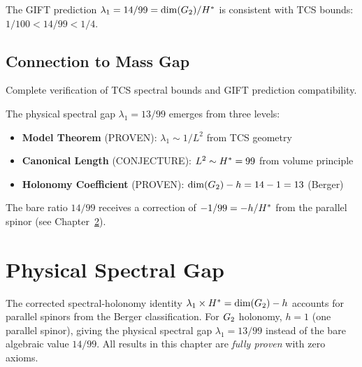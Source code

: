 \begin{theorem}\label{thm:gift_prediction}
    \leanok
    The GIFT prediction $\lambda_1 = 14/99 = \dim(G_2)/H^*$ is consistent
    with TCS bounds: $1/100 < 14/99 < 1/4$.
\end{theorem}

\section{Connection to Mass Gap}

\begin{theorem}\label{thm:tcs_certificate}
    \leanok
    Complete verification of TCS spectral bounds and GIFT prediction compatibility.
\end{theorem}

\begin{remark}
    The physical spectral gap $\lambda_1 = 13/99$ emerges from three levels:
    \begin{itemize}
        \item \textbf{Model Theorem} (PROVEN): $\lambda_1 \sim 1/L^2$ from TCS geometry
        \item \textbf{Canonical Length} (CONJECTURE): $L^2 \sim H^* = 99$ from volume principle
        \item \textbf{Holonomy Coefficient} (PROVEN): $\mathrm{dim}(G_2) - h = 14 - 1 = 13$ (Berger)
    \end{itemize}
    The bare ratio $14/99$ receives a correction of $-1/99 = -h/H^*$ from the
    parallel spinor (see Chapter~\ref{chap:physical_spectral}).
\end{remark}

\chapter{Physical Spectral Gap}\label{chap:physical_spectral}

The corrected spectral-holonomy identity $\lambda_1 \times H^* = \mathrm{dim}(G_2) - h$
accounts for parallel spinors from the Berger classification. For $G_2$ holonomy,
$h = 1$ (one parallel spinor), giving the physical spectral gap
$\lambda_1 = 13/99$ instead of the bare algebraic value $14/99$.
All results in this chapter are \emph{fully proven} with zero axioms.

